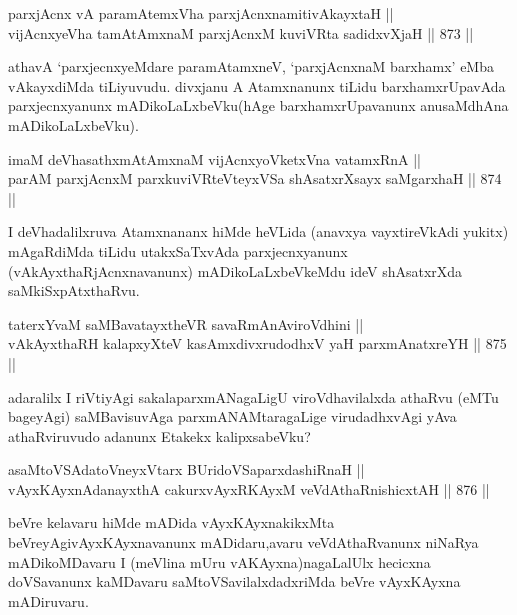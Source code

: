 \begin{shl}
parxjAcnx vA paramAtemxVha parxjAcnxnamitivAkayxtaH ||  \\
vijAcnxyeVha tamAtAmxnaM parxjAcnxM kuviVRta sadidxvXjaH \hfill || 873 ||  
\end{shl}

\begin{artha}
athavA `parxjecnxyeMdare paramAtamxneV, `parxjAcnxnaM barxhamx' eMba vAkayxdiMda tiLiyuvudu. divxjanu A Atamxnanunx tiLidu barxhamxrUpavAda parxjecnxyanunx mADikoLaLxbeVku(hAge barxhamxrUpavanunx anusaMdhAna mADikoLaLxbeVku).
\end{artha}


\begin{shl}
imaM deVhasathxmAtAmxnaM vijAcnxyoVketxVna vatamxRnA || \\
parAM parxjAcnxM parxkuviVRteVteyxVSa shAsatxrXsayx saMgarxhaH \hfill || 874 ||  
\end{shl}

\begin{artha}
I deVhadalilxruva Atamxnananx hiMde heVLida (anavxya vayxtireVkAdi yukitx) mAgaRdiMda tiLidu utakxSaTxvAda parxjecnxyanunx (vAkAyxthaRjAcnxnavanunx) mADikoLaLxbeVkeMdu ideV shAsatxrXda saMkiSxpAtxthaRvu.
\end{artha}

\begin{shl}
taterxYvaM saMBavatayxtheVR savaRmAnAviroVdhini ||  \\
vAkAyxthaRH kalapxyXteV kasAmxdivxrudodhxV yaH parxmAnatxreYH \hfill || 875 ||  
\end{shl}

\begin{artha}
adaralilx I riVtiyAgi sakalaparxmANagaLigU viroVdhavilalxda athaRvu (eMTu bageyAgi) saMBavisuvAga parxmANAMtaragaLige virudadhxvAgi yAva athaRviruvudo adanunx Etakekx kalipxsabeVku?
\end{artha}


\begin{shl}
asaMtoVSAdatoV\s neyxV\s tarx BUridoVSaparxdashiRnaH || \\
vAyxKAyxnAdanayxthA cakurxvAyxRKAyxM veVdAthaRnishicxtAH \hfill || 876 ||  
\end{shl}

\begin{artha}
beVre kelavaru hiMde mADida vAyxKAyxnakikxMta beVreyAgi\break vAyxKAyxnavanunx mADidaru,avaru veVdAthaRvanunx niNaRya mADikoMDavaru I (meVlina mUru vAKAyxna)nagaLalUlx hecicxna doVSavanunx kaMDavaru saMtoVSavilalxdadxriMda beVre vAyxKAyxna mADiruvaru.
\end{artha}

